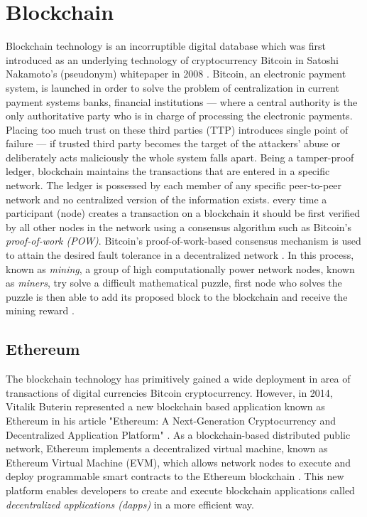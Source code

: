 \section{Blockchain}
Blockchain technology is an incorruptible digital database which was first introduced as an underlying technology of cryptocurrency Bitcoin in Satoshi Nakamoto's (pseudonym) whitepaper in 2008 \cite{nakamoto2008bitcoin}. Bitcoin, an electronic payment system, is launched in order to solve the problem of centralization in current payment systems \ie banks, financial institutions \etc --- where a central authority is the only authoritative party who is in charge of processing the electronic payments. Placing too much trust on these third parties (TTP) introduces single point of failure --- if trusted third party becomes the target of the attackers’ abuse or deliberately acts maliciously the whole system falls apart. 
Being a tamper-proof ledger, blockchain maintains the transactions that are entered in a specific network. The ledger is possessed by each member of any specific peer-to-peer network and no centralized version of the information exists. every time a participant (node) creates a transaction on a blockchain it should be first verified by all other nodes in the network using a consensus algorithm such as Bitcoin’s \emph{proof-of-work (POW)}. Bitcoin’s proof-of-work-based consensus mechanism is used to attain the desired fault tolerance in a decentralized network \cite{lamport1982byzantine,lamport1998part}. In this process, known as \emph{mining}, a group of high computationally power network nodes, known as \emph{miners}, try solve a difficult mathematical puzzle, first node who solves the puzzle is then able to add its proposed block to the blockchain and receive the mining reward \cite{jakobsson1999proofs}. 

\subsection{Ethereum}
The blockchain technology has primitively gained a wide deployment in area of transactions of digital currencies \eg Bitcoin cryptocurrency. However, in 2014, Vitalik Buterin represented a new blockchain based application known as Ethereum in his article "Ethereum: A Next-Generation Cryptocurrency and Decentralized Application Platform" \cite{buterin2014next}. As a blockchain-based distributed public network, Ethereum implements a decentralized virtual machine, known as Ethereum Virtual Machine (EVM), which allows network nodes to execute and deploy programmable smart contracts to the Ethereum blockchain \cite{wood2014ethereum}. This new platform enables developers to create and execute blockchain applications called \emph{decentralized applications (dapps)} in a more efficient way. 

